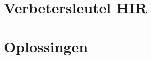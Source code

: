 \documentclass[fleqn,a4paper,11pt,twoside]{article}
\newcommand{\jaartal}{2019}
\newcommand{\groep}{HIR}
\begin{document}
\section*{Verbetersleutel \groep}
\begin{multicols}{2}

\end{multicols}
\newpage
\section*{Oplossingen}

\end{document}
